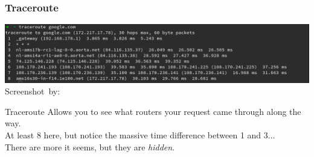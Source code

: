 \begin{frame}
	\frametitle{Traceroute}
	\begin{center}
		\includegraphics[width=\textwidth]{figures/traceroute.png}\\
		\hspace*{15pt}\hbox{\scriptsize Screenshot by: }
	\end{center}
		\begin{block}{Traceroute}
			Allows you to see what routers your request came through along the way.\\
			At least 8 here, but notice the massive time difference between 1 and 3...\\
			There are more it seems, but they are \textit{hidden}.
		\end{block}	
\end{frame}

